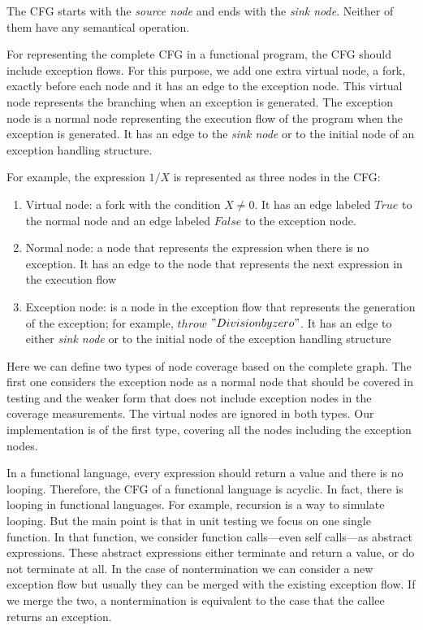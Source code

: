 \documentclass[12pt,a4paper]{report}
\begin{document}
The CFG starts with the \emph{source node} and ends with the \emph{sink node}. Neither of them have any semantical operation.

For representing the complete CFG in a functional program, the CFG should include exception flows. For this purpose, we add one extra virtual node, a fork, exactly before each node and it has an edge to the exception node. This virtual node represents the branching when an exception is generated. The exception node is a normal node representing the execution flow of the program when the exception is generated. It has an edge to the \emph{sink node} or to the initial node of an exception handling structure. 

For example, the expression $1/X$ is represented as three nodes in the CFG:
\begin{enumerate}
 \item Virtual node: a fork with the condition $X\neq0$. It has an edge labeled $True$ to the normal node and an edge labeled $False$ to the exception node.
 \item Normal node: a node that represents the expression when there is no exception. It has an edge to the node that represents the next expression in the execution flow
 \item Exception node: is a node in the exception flow that represents the generation of the exception; for example, $throw$ $"Division by zero"$. It has an edge to either \emph{sink node} or to the initial node of the exception handling structure
\end{enumerate}

Here we can define two types of node coverage based on the complete graph. The first one considers the exception node as a normal node that should be covered in testing and the weaker form that does not include exception nodes in the coverage measurements. The virtual nodes are ignored in both types. Our implementation is of the first type, covering all the nodes including the exception nodes.

In a functional language, every expression should return a value and there is no looping. Therefore, the CFG of a functional language is acyclic. In fact, there is looping in functional languages. For example, recursion is a way to simulate looping. But the main point is that in unit testing we focus on one single function. In that function, we consider function calls---even self calls---as abstract expressions. These abstract expressions either terminate and return a value, or do not terminate at all. In the case of nontermination we can consider a new exception flow but usually they can be merged with the existing exception flow. If we merge the two, a nontermination is equivalent to the case that the callee returns an exception. 
\end{document}
